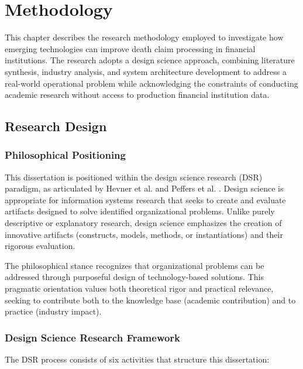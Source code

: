\chapter{Methodology}\label{ch:methodology}

This chapter describes the research methodology employed to investigate how emerging technologies can improve death claim processing in financial institutions. The research adopts a design science approach, combining literature synthesis, industry analysis, and system architecture development to address a real-world operational problem while acknowledging the constraints of conducting academic research without access to production financial institution data.

\section{Research Design}\label{sec:research_design}

\subsection{Philosophical Positioning}

This dissertation is positioned within the design science research (DSR) paradigm, as articulated by Hevner et al. \citep{hevner2004design} and Peffers et al. \citep{peffers2007design}. Design science is appropriate for information systems research that seeks to create and evaluate artifacts designed to solve identified organizational problems. Unlike purely descriptive or explanatory research, design science emphasizes the creation of innovative artifacts (constructs, models, methods, or instantiations) and their rigorous evaluation.

The philosophical stance recognizes that organizational problems can be addressed through purposeful design of technology-based solutions. This pragmatic orientation values both theoretical rigor and practical relevance, seeking to contribute both to the knowledge base (academic contribution) and to practice (industry impact).

\subsection{Design Science Research Framework}

The DSR process consists of six activities that structure this dissertation:

